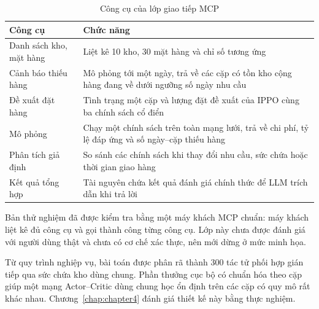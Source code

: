 \begin{table}[H]
    \centering
    \caption{Công cụ của lớp giao tiếp MCP}
    \label{tab:congCuMCP}
    \small
    \begin{tabular}{|l|>{\raggedright\arraybackslash}p{9.4cm}|}
        \hline
        Công cụ & Chức năng \\
        \hline
        Danh sách kho, mặt hàng & Liệt kê 10 kho, 30 mặt hàng và chỉ số tương ứng \\ \hline
        Cảnh báo thiếu hàng & Mô phỏng tới một ngày, trả về các cặp có tồn kho cộng hàng đang về dưới ngưỡng số ngày nhu cầu \\ \hline
        Đề xuất đặt hàng & Tình trạng một cặp và lượng đặt đề xuất của IPPO cùng ba chính sách cổ điển \\ \hline
        Mô phỏng & Chạy một chính sách trên toàn mạng lưới, trả về chi phí, tỷ lệ đáp ứng và số ngày--cặp thiếu hàng \\ \hline
        Phân tích giả định & So sánh các chính sách khi thay đổi nhu cầu, sức chứa hoặc thời gian giao hàng \\ \hline
        Kết quả tổng hợp & Tài nguyên chứa kết quả đánh giá chính thức để LLM trích dẫn khi trả lời \\
        \hline
    \end{tabular}
\end{table}

Bản thử nghiệm đã được kiểm tra bằng một máy khách MCP chuẩn: máy khách liệt kê đủ công cụ và gọi thành công từng công cụ. Lớp này chưa được đánh giá với người dùng thật và chưa có cơ chế xác thực, nên mới dừng ở mức minh họa.

\FloatBarrier
Từ quy trình nghiệp vụ, bài toán được phân rã thành 300 tác tử phối hợp gián tiếp qua sức chứa kho dùng chung. Phần thưởng cục bộ có chuẩn hóa theo cặp giúp một mạng Actor--Critic dùng chung học ổn định trên các cặp có quy mô rất khác nhau. Chương~\ref{chap:chapter4} đánh giá thiết kế này bằng thực nghiệm.
